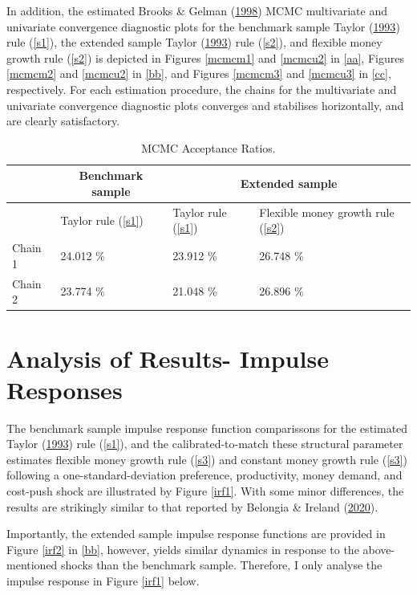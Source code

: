 \documentclass[11pt,preprint, authoryear]{elsarticle}
\numberwithin{equation}{section}
\numberwithin{figure}{section}
\numberwithin{table}{section}
\begin{document}
In addition, the estimated Brooks \& Gelman
(\protect\hyperlink{ref-brooks1998}{1998}) MCMC multivariate and
univariate convergence diagnostic plots for the benchmark sample Taylor
(\protect\hyperlink{ref-taylor1993}{1993}) rule (\ref{s1}), the extended
sample Taylor (\protect\hyperlink{ref-taylor1993}{1993}) rule
(\ref{s2}), and flexible money growth rule (\ref{s2}) is depicted in
Figures \ref{mcmcm1} and \ref{mcmcu2} in \ref{aa}, Figures \ref{mcmcm2}
and \ref{mcmcu2} in \ref{bb}, and Figures \ref{mcmcm3} and \ref{mcmcu3}
in \ref{cc}, respectively. For each estimation procedure, the chains for
the multivariate and univariate convergence diagnostic plots converges
and stabilises horizontally, and are clearly satisfactory.

\begin{center}
\small
\begin{longtable}{|l|l|l|l|}
\caption{MCMC Acceptance Ratios.}
\label{ar}\\
\toprule
  & \multicolumn{1}{|c|}{\textbf{Benchmark sample}} & \multicolumn{2}{|c|}{\textbf{Extended sample}}\\
\hline
 & Taylor rule (\ref{s1}) & Taylor rule (\ref{s1}) & Flexible money growth rule (\ref{s2}) \\
\hline
Chain 1 & 24.012 \% & 23.912 \% & 26.748 \%  \\
Chain 2 & 23.774 \% & 21.048 \% & 26.896 \% \\
\bottomrule
\end{longtable}
\end{center}

\hypertarget{analysis-of-results--impulse-responses}{%
\section{Analysis of Results- Impulse
Responses}\label{analysis-of-results--impulse-responses}}

The benchmark sample impulse response function comparissons for the
estimated Taylor (\protect\hyperlink{ref-taylor1993}{1993}) rule
(\ref{s1}), and the calibrated-to-match these structural parameter
estimates flexible money growth rule (\ref{s3}) and constant money
growth rule (\ref{s3}) following a one-standard-deviation preference,
productivity, money demand, and cost-push shock are illustrated by
Figure \ref{irf1}. With some minor differences, the results are
strikingly similar to that reported by Belongia \& Ireland
(\protect\hyperlink{ref-belongia2020}{2020}).

Importantly, the extended sample impulse response functions are provided
in Figure \ref{irf2} in \ref{bb}, however, yields similar dynamics in
response to the above-mentioned shocks than the benchmark sample.
Therefore, I only analyse the impulse response in Figure \ref{irf1}
below.
\end{document}
